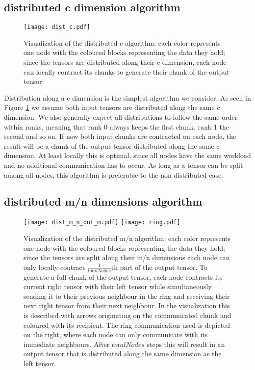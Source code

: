\subsection{distributed c dimension algorithm}

\begin{figure}[h]
\centering\texttt{[image: dist\_c.pdf]}
\caption{Visualization of the distributed c algorithm; 
each color represents one node with the coloured blocks representing the data they hold; 
since the tensors are distributed along their c dimension, each node can locally contract its chunks to generate their chunk of the output tensor}
\label{fig:c_algo}
\end{figure}

Distribution along a c dimension is the simplest algorithm we consider. 
As seen in Figure \ref{fig:c_algo} we assume both input tensors are distributed along the same c dimension.
We also generally expect all distributions to follow the same order within ranks, meaning that rank 0 always keeps the first chunk, rank 1 the second and so on.
If now both input chunks are contracted on each node, the result will be a chunk of the output tensor distributed along the same c dimension.
At least locally this is optimal, since all nodes have the same workload and no additional communication has to occur.
As long as a tensor can be split among all nodes, this algorithm is preferable to the non distributed case.

\subsection{distributed m/n dimensions algorithm}

\begin{figure}[h]
\texttt{[image: dist\_m\_n\_out\_m.pdf]}
\texttt{[image: ring.pdf]}
\caption{Visualization of the distributed m/n algorithm; 
each color represents one node with the coloured blocks representing the data they hold; 
since the tensors are split along their m/n dimensions each node can only locally contract $\frac{1}{totalNodes}$th part of the output tensor.
To generate a full chunk of the output tensor, each node contracts its current right tensor with their left tensor while simultaneously sending it to their previous neighbour in the ring and receiving their next right tensor from their next neighbour.
In the visualization this is described with arrows originating on the communicated chunk and coloured with its recipient.
The ring communication used is depicted on the right, where each node can only communicate with its immediate neighbours.
After $totalNodes$ steps this will result in an output tensor that is distributed along the same dimension as the left tensor.
}
\label{fig:m_n_algo}
\end{figure}

